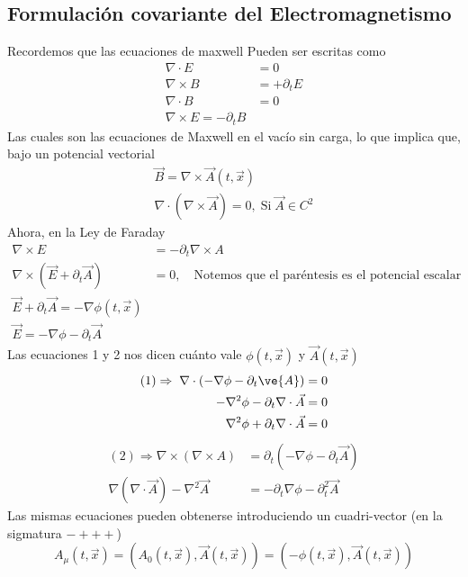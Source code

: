 \documentclass[../main.tex]{subfiles}
\begin{document}
\subsection{Formulación covariante del Electromagnetismo}
Recordemos que las ecuaciones de maxwell Pueden ser escritas como
\begin{align}
  \nabla \cdot E & = 0 \\
  \nabla \times B & = +\partial_t E \\
  \nabla \cdot B & = 0 \\
  \nabla \times E = -\partial_t B
\end{align}
Las cuales son las ecuaciones de Maxwell en el vacío sin carga, lo que implica que, bajo un potencial vectorial
\begin{align*}
  \vec{B} = \nabla \times \vec{A}(t,\vec{x}) \\
  \nabla \cdot (\nabla \times \vec{A}) = 0, \; \text{Si}\; \vec{A}\in C^2
\end{align*}
Ahora, en la Ley de Faraday
\begin{align*}
  \nabla \times E & = -\partial_t \nabla \times A \\
  \nabla \times ( \vec{E} +\partial_t \vec{A} ) & = 0, \quad \text{Notemos que el paréntesis es el potencial escalar} \\
  \vec{E} + \partial_t \vec{A} = -\nabla \phi(t,\vec{x}) \\
  \vec{E} = -\nabla \phi - \partial_t\vec{A}
\end{align*}
Las ecuaciones 1 y 2 nos dicen cuánto vale $\phi(t,\vec{x})$ y $\vec{A}(t,\vec{x})$ 
\begin{align*}
  (1)\Rightarrow \; \nabla \cdot (-\nabla\phi - \partial_t\ve{A}) & = 0 \\
  -\nabla^2\phi - \partial_t\nabla \cdot \vec{A} & = 0 \\
  \nabla^2\phi + \partial_t\nabla \cdot \vec{A} & = 0
\end{align*}
\begin{align*}
  (2) \Rightarrow \nabla \times (\nabla \times A) & = \partial_t (-\nabla \phi - \partial_t \vec{A}) \\
  \nabla (\nabla \cdot \vec{A}) - \nabla^2\vec{A} & = -\partial_t\nabla\phi - \partial^2_t \vec{A}
\end{align*}
Las mismas ecuaciones pueden obtenerse introduciendo un cuadri-vector (en la sigmatura $-+++$)
\begin{equation}
  A_\mu(t,\vec{x}) = (A_0(t,\vec{x}),\vec{A}(t,\vec{x})) = (-\phi(t,\vec{x}),\vec{A}(t,\vec{x}))
 \end{equation}
\end{document}
